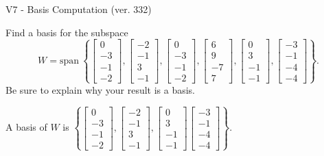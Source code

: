 \begin{exercise}
  \begin{exerciseTitle}V7 - Basis Computation (ver. 332)\end{exerciseTitle}
  \begin{exerciseStatement}
    Find a basis for the subspace 
\[W=\mathrm{span}\ \left\{\left[\begin{array}{r}
0 \\
-3 \\
-1 \\
-2
\end{array}\right] , \left[\begin{array}{r}
-2 \\
-1 \\
3 \\
-1
\end{array}\right] , \left[\begin{array}{r}
0 \\
-3 \\
-1 \\
-2
\end{array}\right] , \left[\begin{array}{r}
6 \\
9 \\
-7 \\
7
\end{array}\right] , \left[\begin{array}{r}
0 \\
3 \\
-1 \\
-1
\end{array}\right] , \left[\begin{array}{r}
-3 \\
-1 \\
-4 \\
-4
\end{array}\right]\right\}.\]
 Be sure to explain why your result is a basis.


  \end{exerciseStatement}
  \begin{exerciseAnswer}
   A basis of \(W\) is  \(\left\{\left[\begin{array}{r}
0 \\
-3 \\
-1 \\
-2
\end{array}\right] , \left[\begin{array}{r}
-2 \\
-1 \\
3 \\
-1
\end{array}\right] , \left[\begin{array}{r}
0 \\
3 \\
-1 \\
-1
\end{array}\right] \left[\begin{array}{r}
-3 \\
-1 \\
-4 \\
-4
\end{array}\right]\right\}\).
  


  \end{exerciseAnswer}
\end{exercise}